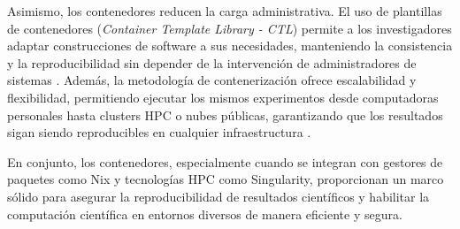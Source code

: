 Asimismo, los contenedores reducen la carga administrativa. El uso de plantillas de contenedores (\textit{Container Template Library - CTL}) permite a los investigadores adaptar construcciones de software a sus necesidades, manteniendo la consistencia y la reproducibilidad sin depender de la intervención de administradores de sistemas \cite{Vaillancourt2020SelfScalingCA}. Además, la metodología de contenerización ofrece escalabilidad y flexibilidad, permitiendo ejecutar los mismos experimentos desde computadoras personales hasta clusters HPC o nubes públicas, garantizando que los resultados sigan siendo reproducibles en cualquier infraestructura \cite{Vaillancourt2020SelfScalingCA}.

En conjunto, los contenedores, especialmente cuando se integran con gestores de paquetes como Nix y tecnologías HPC como Singularity, proporcionan un marco sólido para asegurar la reproducibilidad de resultados científicos y habilitar la computación científica en entornos diversos de manera eficiente y segura.